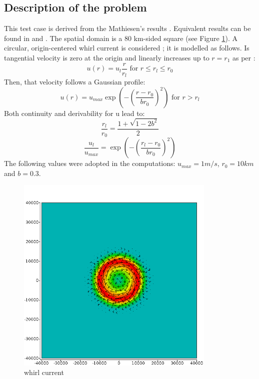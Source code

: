 \subsection{Description of the problem}
%
This test case is derived from the Mathiesen's results \cite{Mathiesen1987}.
Equivalent results can be found in \cite{Tolman1991} and \cite{Hubbert1991}. The
spatial domain is a 80 km-sided square (see Figure \ref{current}). A circular,
origin-centered whirl current is considered ; it is modelled as follows. Is
tangential velocity is zero at the origin and linearly increases up to $r=r_1$
as per :
$$
u(r) = u_l\frac{r}{r_l} \mbox{ for } r\le r_l\le r_0
$$
Then, that velocity follows a Gaussian profile:
$$
u(r)=u_{max} \exp \left( -\left(\frac{r-r_0}{br_0}\right)^2 \right) \mbox{ for } r > r_l
$$
Both continuity and derivability for u lead to:
$$
\frac{r_l}{r_0}=\frac{1+ \sqrt{1-2b^2}}{2} %
$$
$$
\frac{u_l}{u_{max}}= \exp \left( -\left(\frac{r_l-r_0}{br_0}\right)^2 \right)
$$
The following values were adopted in the computations: $u_{max}=1m/s$,
$r_0=10km$ and $b=0.3$.
%
%
\begin{figure} [!h]
\centering
\includegraphics[width=0.85\textwidth]{current.png}
 \caption{whirl current}
\label{current}
\end{figure}
